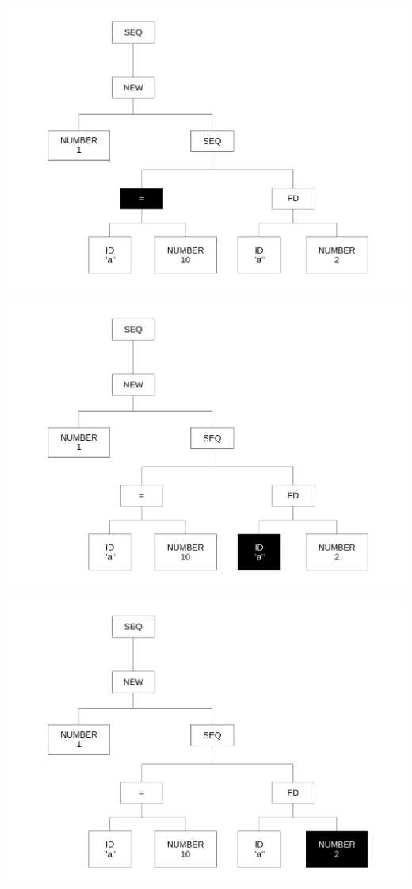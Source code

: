 \begin{frame}
\includegraphics[scale=0.3]{doc/Presentation/img/arbre4.pdf}
\end{frame}

\begin{frame}
\includegraphics[scale=0.3]{doc/Presentation/img/arbre5.pdf}
\end{frame}

\begin{frame}
\includegraphics[scale=0.3]{doc/Presentation/img/arbre6.pdf}
\end{frame}

